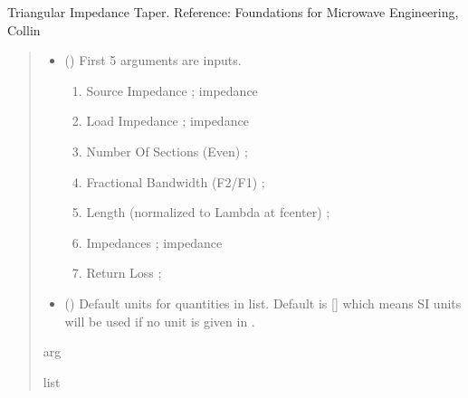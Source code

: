 \documentclass[letterpaper,10pt,english]{sphinxmanual}
\begin{document}

\begin{fulllineitems}
\label{\detokenize{components:components.Triangular_Taper_Impedance_Transformer}}
\pysigstartsignatures
{}
\pysigstopsignatures
\sphinxAtStartPar
Triangular Impedance Taper.
Reference:  Foundations for Microwave Engineering, Collin
\begin{quote}\begin{description}
\begin{itemize}
\item {} 
\sphinxAtStartPar
{} () \textendash{} 
\sphinxAtStartPar
First 5 arguments are inputs.
\begin{enumerate}
%
\item {} 
\sphinxAtStartPar
Source Impedance ; impedance

\item {} 
\sphinxAtStartPar
Load Impedance ; impedance

\item {} 
\sphinxAtStartPar
Number Of Sections (Even) ;

\item {} 
\sphinxAtStartPar
Fractional Bandwidth (F2/F1) ;

\item {} 
\sphinxAtStartPar
Length (normalized to Lambda at fcenter) ;

\item {} 
\sphinxAtStartPar
Impedances ; impedance

\item {} 
\sphinxAtStartPar
Return Loss ;

\end{enumerate}


\item {} 
\sphinxAtStartPar
{} (\sphinxstyleliteralemphasis{\sphinxupquote{, }}) \textendash{} Default units for quantities in  list. Default is {[}{]} which means SI units will be used if no unit is given in .

\end{itemize}

\sphinxAtStartPar
arg

\sphinxAtStartPar
list

\end{description}\end{quote}

\end{fulllineitems}
\end{document}
